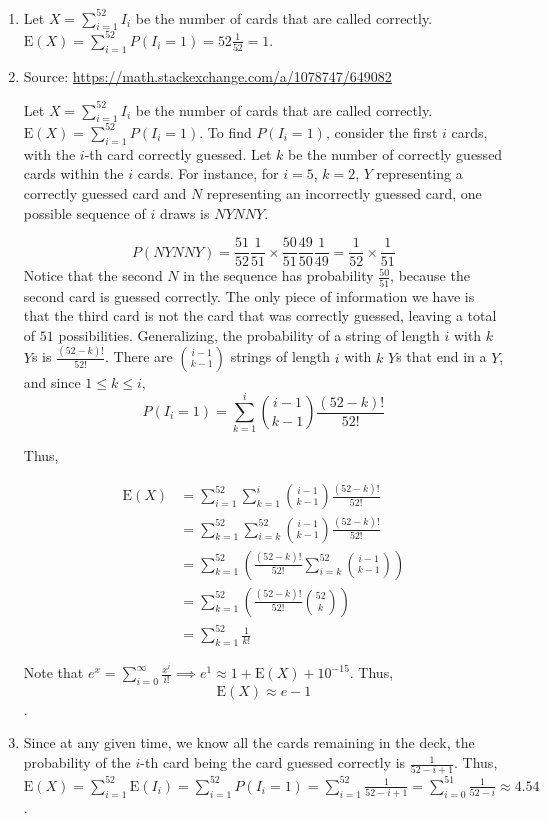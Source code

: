 \begin{enumerate}[label=(\alph*)]
\item Let $X = \sum_{i=1}^{52}I_{i}$ be the number of cards that are called
correctly. $\text{E}(X) = \sum_{i=1}^{52}P(I_{i}=1) = 52\frac{1}{52} = 1$.

\item Source: \url{https://math.stackexchange.com/a/1078747/649082}

Let $X = \sum_{i=1}^{52}I_{i}$ be the number of cards that are
called
correctly. $\text{E}(X) = \sum_{i=1}^{52}P(I_{i}=1)$. To find $P(I_{i}=1)$,
consider the first $i$ cards, with the $i$-th card correctly guessed. Let
$k$ be the number of correctly guessed cards within the $i$ cards. For instance,
for $i=5$, $k=2$, $Y$ representing a correctly guessed card and $N$ representing
an incorrectly guessed card, one possible sequence of $i$ draws is $NYNNY$.

$$P(NYNNY) = \frac{51}{52}\frac{1}{51} \times \frac{50}{51}\frac{49}
{50}\frac{1}{49} = \frac{1}{52} \times \frac{1}{51}$$ Notice that
the second $N$ in the sequence has probability $\frac{50}{51}$,
because the second card is guessed correctly. The only piece
of information we have is that the third card is not the card that
was correctly guessed, leaving a total of $51$ possibilities. Generalizing, the
probability of a string of length $i$ with $k$ $Y$s is $\frac{(52-k)!}{52!}$.
There are $\binom{i-1}{k-1}$ strings of length $i$ with $k$ $Y$s that end in a
$Y$, and since $1 \leq k \leq i$, $$P(I_{i}=1) = \sum_{k=1}^{i}\binom{i-1}{k-1}
\frac{(52-k)!}{52!}$$

Thus,

\begin{align*}
\text{E}(X) &= \sum_{i=1}^{52}\sum_{k=1}^{i}\binom{i-1}{k-1}\frac{(52-k)!}{52!} \\
&= \sum_{k=1}^{52}\sum_{i=k}^{52}\binom{i-1}{k-1}\frac{(52-k)!}{52!} \\
&= \sum_{k=1}^{52}(\frac{(52-k)!}{52!}\sum_{i=k}^{52}\binom{i-1}{k-1}) \\
&= \sum_{k=1}^{52}(\frac{(52-k)!}{52!}\binom{52}{k}) \\
&= \sum_{k=1}^{52}\frac{1}{k!}
\end{align*}

Note that $e^{x} = \sum_{i=0}^{\infty}\frac{x^{i}}{i!} \implies e^{1} \approx 1
+
\text{E}(X) + 10^{-15}$. Thus, $$\text{E}(X) \approx e - 1$$.

\item Since at any given time, we know all the cards remaining in the deck, the
probability of the $i$-th card being the card guessed correctly is $\frac{1}
{52-i+1}$. Thus, $\text{E}(X) = \sum_{i=1}^{52}\text{E}(I_{i}) = \sum_{i=1}^{52}P
(I_{i}=1) = \sum_{i=1}^{52}\frac{1}{52-i+1} = \sum_{i=0}^{51}\frac{1}{52-i}
\approx 4.54$.
\end{enumerate}